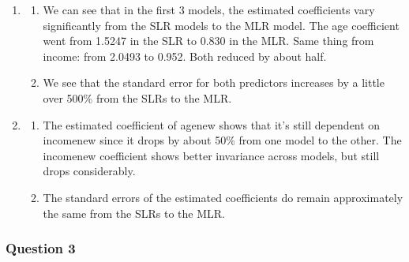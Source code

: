 \documentclass{article}
\providecommand{\tightlist}{%
      \setlength{\itemsep}{0pt}\setlength{\parskip}{0pt}}
\begin{document}
\begin{enumerate}
\def\labelenumi{\alph{enumi})}
\setcounter{enumi}{1}
\item
  \begin{enumerate}
  \def\labelenumii{\roman{enumii}.}
  \tightlist
  \item
    We can see that in the first 3 models, the estimated coefficients
    vary significantly from the SLR models to the MLR model. The age
    coefficient went from 1.5247 in the SLR to 0.830 in the MLR. Same
    thing from income: from 2.0493 to 0.952. Both reduced by about half.
  \item
    We see that the standard error for both predictors increases by a
    little over 500\% from the SLRs to the MLR.
  \end{enumerate}
\item
  \begin{enumerate}
  \def\labelenumii{\roman{enumii}.}
  \tightlist
  \item
    The estimated coefficient of agenew shows that it's still dependent
    on incomenew since it drops by about 50\% from one model to the
    other. The incomenew coefficient shows better invariance across
    models, but still drops considerably.
  \item
    The standard errors of the estimated coefficients do remain
    approximately the same from the SLRs to the MLR.
  \end{enumerate}
\end{enumerate}

\newpage
    \subsubsection{Question 3}\label{question-3}
\end{document}
